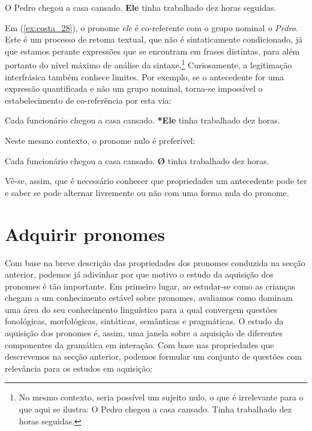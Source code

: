 \documentclass[output=paper]{LSP/langsci}
\begin{document}
\ea\label{ex:costa_28}
O Pedro chegou a casa cansado. \textbf{Ele} tinha trabalhado dez horas seguidas.
\z

Em (\ref{ex:costa_28}), o pronome \textit{ele} é co-referente com o grupo nominal \textit{o Pedro}. Este é um processo de retoma textual, que não é sintaticamente condicionado, já que estamos perante expressões que se encontram em frases distintas, para além portanto do nível máximo de análise da sintaxe.\footnote{No mesmo contexto, seria possível um sujeito nulo, o que é irrelevante para o que aqui se ilustra:
\ea\label{ex:costa_i}
O Pedro chegou a casa cansado. Tinha trabalhado dez horas seguidas.
\z} Curiosamente, a legitimação interfrásica também conhece limites. Por exemplo, se o antecedente for uma expressão quantificada e não um grupo nominal, torna-se impossível o estabelecimento de co-referência por esta via:

\ea\label{ex:costa_29}
Cada funcionário chegou a casa cansado. \textbf{*Ele} tinha trabalhado dez horas.
\z

Neste mesmo contexto, o pronome nulo é preferível:

\ea\label{ex:costa_30}
Cada funcionário chegou a casa cansado. \textbf{Ø} tinha trabalhado dez horas.
\z

Vê-se, assim, que é necessário conhecer que propriedades um antecedente pode ter e saber se pode alternar livremente ou não com uma forma nula do pronome.

\section{Adquirir pronomes}
\label{sec:costa_adquirir_pronomes}

Com base na breve descrição das propriedades dos pronomes conduzida na secção anterior, podemos já adivinhar por que motivo o estudo da aquisição dos pronomes é tão importante. Em primeiro lugar, ao estudar-se como as crianças chegam a um conhecimento estável sobre pronomes, avaliamos como dominam uma área do seu conhecimento linguístico para a qual convergem questões fonológicas, morfológicas, sintáticas, semânticas e pragmáticas. O estudo da aquisição dos pronomes é, assim, uma janela sobre a aquisição de diferentes componentes da gramática em interação. Com base nas propriedades que descrevemos na secção anterior, podemos formular um conjunto de questões com relevância para os estudos em aquisição:
\end{document}
